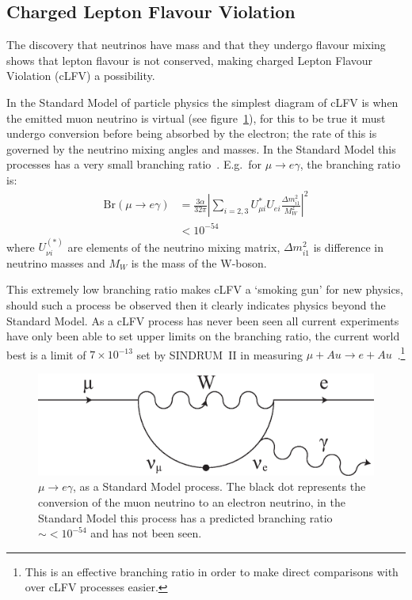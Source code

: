 \subsection{Charged Lepton Flavour Violation} %
\label{sec:charged_lepton_flavour_violation}
The discovery that neutrinos have mass and that they undergo flavour mixing shows that lepton flavour is not conserved, making charged Lepton Flavour Violation (cLFV) a possibility. 

In the Standard Model of particle physics the simplest diagram of cLFV is when the emitted muon neutrino is virtual (see figure~\ref{fig:images_cLFV_mu-e_conversion}), for this to be true it must undergo conversion before being absorbed by the electron; the rate of this is governed by the neutrino mixing angles and masses. In the Standard Model this processes has a very small branching ratio~\cite{effective_lagrangian_for_clfv}. E.g.\ for \( \mu\rightarrow e\gamma \), the branching ratio is: 
\begin{align}
  \text{Br}(\mu\rightarrow e\gamma) 
    &= \frac{3\alpha}{32\pi}
      \left|\sum\limits_{i=2,3} U^*_{\mu i} U_{ei}
            \frac{\Delta m^2_{i1}}{M^2_W}
     \right|^2 \\
    &< 10^{-54} \label{equ:clfv_branching_ratio}
\end{align}
where \( U_{\nu i}^{(*)} \) are elements of the neutrino mixing matrix, \(\Delta m^2_{i1}\) is difference in neutrino masses and \(M_{W}\) is the mass of the W-boson.

This extremely low branching ratio makes cLFV a `smoking gun' for new physics, should such a process be observed then it clearly indicates physics beyond the Standard Model. As a cLFV process has never been seen all current experiments have only been able to set upper limits on the branching ratio, the current world best is a limit of \(7\times10^{-13}\) set by SINDRUM~II in measuring \(\mu+Au\rightarrow e+Au\)~\cite{sindrum_2_mu_ag_e}.\footnote{This is an effective branching ratio in order to make direct comparisons with over cLFV processes easier.}

\begin{figure}[hptb]
  \centering
    \includegraphics[width=.7\textwidth]{images/cLFV_mu-e_conversion.eps}
  \caption{\(\mu\rightarrow e\gamma\), as a Standard Model process. The black dot represents the conversion of the muon neutrino to an electron neutrino, in the Standard Model this process has a predicted branching ratio \(\sim <10^{-54} \) and has not been seen.}
  \label{fig:images_cLFV_mu-e_conversion}
\end{figure}

